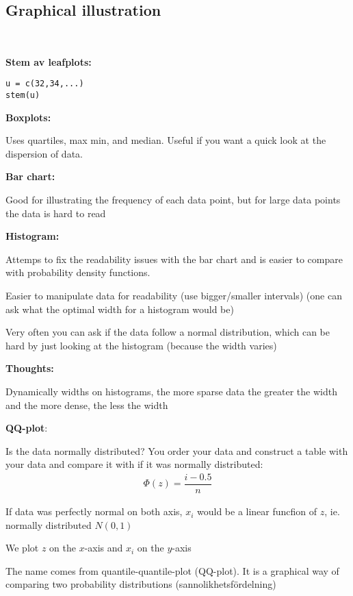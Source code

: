\subsection{Graphical illustration}\hfill\\\par
\noindent\textbf{Stem av leafplots:}
\begin{verbatim}
u = c(32,34,...)
stem(u)
\end{verbatim}
\par\bigskip
\noindent\textbf{Boxplots:}\par
\noindent Uses quartiles, max min, and median. Useful if you want a quick look at the dispersion of data.
\par\bigskip
\noindent\textbf{Bar chart:}\par
\noindent Good for illustrating the frequency of each data point, but for large data points the data is hard to read
\par\bigskip
\noindent\textbf{Histogram:}\par
\noindent Attemps to fix the readability issues with the bar chart and is easier to compare with probability density functions.\par
\noindent Easier to manipulate data for readability (use bigger/smaller intervals) (one can ask what the optimal width for a histogram would be)\par
\noindent Very often you can ask if the data follow a normal distribution, which can be hard by just looking at the histogram (because the width varies) 
\par\bigskip
\noindent\textbf{Thoughts:}\par
\noindent Dynamically widths on histograms, the more sparse data the greater the width and the more dense, the less the width 
\par\bigskip
\noindent\textbf{QQ-plot}:\par
\noindent Is the data normally distributed? You order your data and construct a table with your data and compare it with if it was normally distributed:
\begin{equation*}
  \begin{gathered}
    \Phi(z) = \dfrac{i-0.5}{n}
  \end{gathered}
\end{equation*}
\par\bigskip
\noindent If data was perfectly normal on both axis, $x_i$ would be a linear funcfion of $z$, ie. normally distributed $N(0,1)$\par
\noindent We plot $z$ on the $x$-axis and $x_i$ on the $y$-axis
\par\bigskip
\noindent The name comes from quantile-quantile-plot (QQ-plot). It is a graphical way of comparing two probability distributions (sannolikhetsfördelning) 
